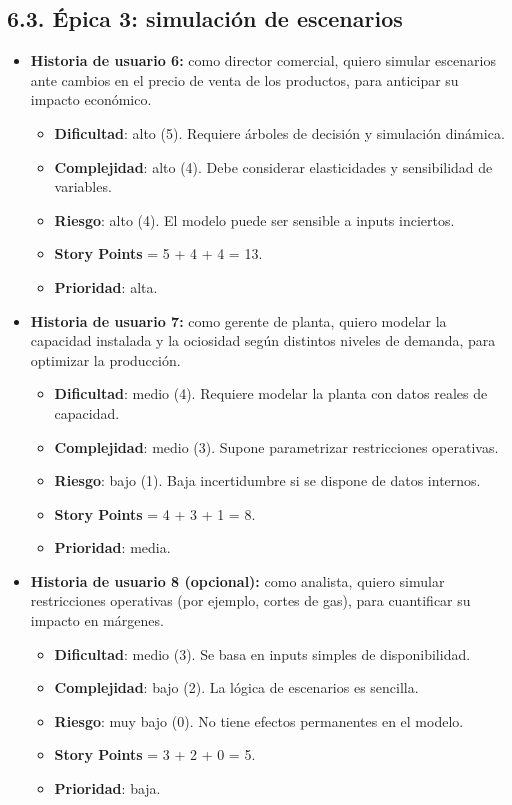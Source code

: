 \documentclass[
11pt, %
]{charter}
\begin{document}
\subsection*{6.3. Épica 3: simulación de escenarios}
\begin{itemize}
  \item \textbf{Historia de usuario 6:} como director comercial, quiero simular escenarios ante cambios en el precio de venta de los productos, para anticipar su impacto económico.
    \begin{itemize}
      \item \textbf{Dificultad}: alto (5). Requiere árboles de decisión y simulación dinámica.
      \item \textbf{Complejidad}: alto (4). Debe considerar elasticidades y sensibilidad de variables.
      \item \textbf{Riesgo}: alto (4). El modelo puede ser sensible a inputs inciertos.
      \item \textbf{Story Points} = 5 + 4 + 4 = 13.
      \item \textbf{Prioridad}: alta.
    \end{itemize}
  \item \textbf{Historia de usuario 7:} como gerente de planta, quiero modelar la capacidad instalada y la ociosidad según distintos niveles de demanda, para optimizar la producción.
    \begin{itemize}
      \item \textbf{Dificultad}: medio (4). Requiere modelar la planta con datos reales de capacidad.
      \item \textbf{Complejidad}: medio (3). Supone parametrizar restricciones operativas.
      \item \textbf{Riesgo}: bajo (1). Baja incertidumbre si se dispone de datos internos.
      \item \textbf{Story Points} = 4 + 3 + 1 = 8.
      \item \textbf{Prioridad}: media.
    \end{itemize}
  \item \textbf{Historia de usuario 8 (opcional):} como analista, quiero simular restricciones operativas (por ejemplo, cortes de gas), para cuantificar su impacto en márgenes.
    \begin{itemize}
      \item \textbf{Dificultad}: medio (3). Se basa en inputs simples de disponibilidad.
      \item \textbf{Complejidad}: bajo (2). La lógica de escenarios es sencilla.
      \item \textbf{Riesgo}: muy bajo (0). No tiene efectos permanentes en el modelo.
      \item \textbf{Story Points} = 3 + 2 + 0 = 5.
      \item \textbf{Prioridad}: baja.
    \end{itemize}
\end{itemize}
\end{document}
